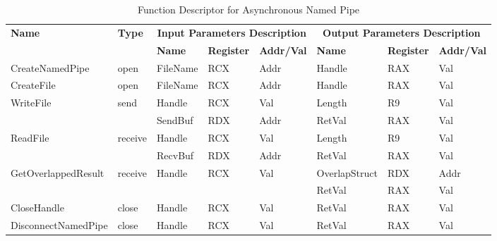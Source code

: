 \begin{table}[H]
  \centering
  \caption{Function Descriptor for Asynchronous Named Pipe}
  \label{nameasyn}
\begin{tabular}{|l|l|l|l|l|l|l|l|}
\hline
             \multirow{2}{*}{{\textbf{Name}}} & \multirow{2}{*}{{\textbf{Type}}} & \multicolumn{3}{c|}{\textbf{Input Parameters Description}} & \multicolumn{3}{c|}{\textbf{Output Parameters Description}} \\
              \cline{3-8} 
             & & \textbf{Name}& \textbf{Register} & \textbf{Addr/Val} & \textbf{Name}& \textbf{Register} &  \textbf{Addr/Val}  \\
             \hline
      CreateNamedPipe
       &open & FileName & RCX  & Addr &  Handle & RAX & Val\\
      \hline         
      CreateFile
       &open & FileName & RCX & Addr&  Handle & RAX & Val\\ 
      \hline              
      \multirow{2}{*}{WriteFile}
       &\multirow{2}{*}{send} &  Handle & RCX & Val & Length & R9 & Val\\
        \cline{3-8} 
       & & SendBuf & RDX & Addr & RetVal& RAX & Val\\
      \hline            
      \multirow{2}{*}{ReadFile}
       &\multirow{2}{*}{receive} &  Handle & RCX & Val& Length & R9 & Val\\
        \cline{3-8} 
       & & RecvBuf & RDX  & Addr & RetVal& RAX & Val\\
      \hline    
           \multirow{2}{*}{GetOverlappedResult} &
       \multirow{2}{*}{receive} &  \multirow{2}{*}{Handle} & \multirow{2}{*}{RCX} & \multirow{2}{*}{Val} &OverlapStruct &RDX & Addr\\
               \cline{6-8} 
       & &  &   &  & RetVal& RAX & Val\\
      \hline     
      CloseHandle &
       close &  Handle & RCX & Val & RetVal& RAX & Val\\
      \hline            
      DisconnectNamedPipe &
      close &  Handle & RCX & Val & RetVal& RAX & Val\\
      \hline               
  \end{tabular}  
\end{table}

